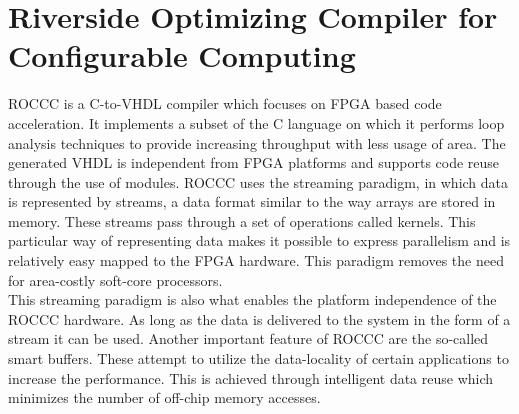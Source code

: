 \section{Riverside Optimizing Compiler for Configurable Computing} 
ROCCC is a C-to-VHDL compiler which focuses on FPGA based code acceleration. It implements a subset of the C language on which it performs loop analysis techniques to provide increasing throughput with less usage of area\cite{martin_high-level_2009}. The generated VHDL is independent from FPGA platforms and supports code reuse through the use of modules. 
ROCCC uses the streaming paradigm, in which data is represented by streams, a data format similar to the way arrays are stored in memory. These streams pass through a set of operations called kernels. This particular way of representing data makes it possible to express parallelism and is relatively easy mapped to the FPGA hardware. This paradigm removes the need for area-costly soft-core processors\cite{buyukkurt_impact_2006}.\\
This streaming paradigm is also what enables the platform independence of the ROCCC hardware. As long as the data is delivered to the system in the form of a stream it can be used.
Another important feature of ROCCC are the so-called smart buffers. These attempt to utilize the data-locality of certain applications to increase the performance. This is achieved through intelligent data reuse which minimizes the number of off-chip memory accesses. 

